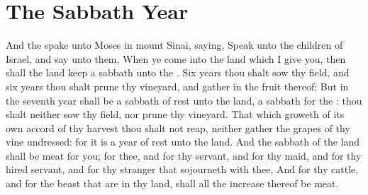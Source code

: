 \section*{The Sabbath Year}
\begin{biblechapter} %
\verse And the \LORD spake unto Moses in mount Sinai, saying,
\verse Speak unto the children of Israel, and say unto them, When ye come into the land which I give you, then shall the land keep a sabbath unto the \LORD.
\verse Six years thou shalt sow thy field, and six years thou shalt prune thy vineyard, and gather in the fruit thereof;
\verse But in the seventh year shall be a sabbath of rest unto the land, a sabbath for the \LORD: thou shalt neither sow thy field, nor prune thy vineyard.
\verse That which groweth of its own accord of thy harvest thou shalt not reap, neither gather the grapes of thy vine undressed: for it is a year of rest unto the land.
\verse And the sabbath of the land shall be meat for you; for thee, and for thy servant, and for thy maid, and for thy hired servant, and for thy stranger that sojourneth with thee,
\verse And for thy cattle, and for the beast that are in thy land, shall all the increase thereof be meat.

\end{biblechapter}
